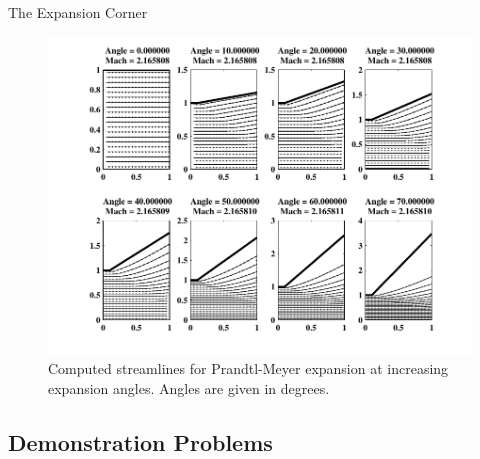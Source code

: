 \documentclass{beamer}
\begin{document}

\begin{frame}{The Expansion Corner}
\begin{figure}[htbp] %
   \centering
   \includegraphics[height=.7\textheight]{Expansion.pdf} 
   \caption{Computed streamlines for Prandtl-Meyer expansion at increasing expansion angles. Angles are given in degrees. }
   \label{fig:expansion_separation}

\end{figure}

\end{frame}

\subsection{Demonstration Problems}
\end{document}
